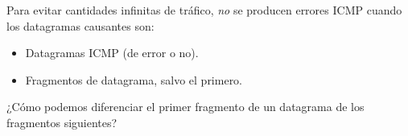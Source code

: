 Para evitar cantidades infinitas de tráfico, \textit{no} se producen errores ICMP
cuando los datagramas causantes son:
\begin{itemize}
\item Datagramas ICMP (de error o no).
\item Fragmentos de datagrama, salvo el primero.
\end{itemize}

\begin{exercise}
¿Cómo podemos diferenciar el primer fragmento de un datagrama de los fragmentos siguientes?
\end{exercise}

